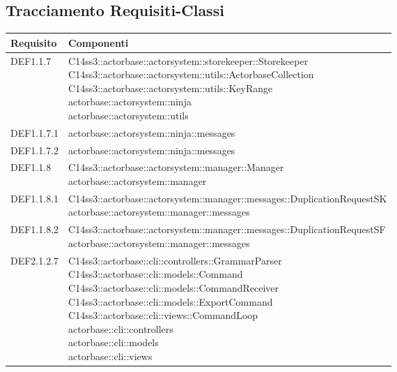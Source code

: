 \documentclass{scalatekids-article}
\begin{document}
\subsection{Tracciamento Requisiti-Classi}
\begin{longtable}[H]{|p{4.5cm}|p{13cm}|}
\hline
\textbf{Requisito} & \textbf{Componenti}\\
\hline
DEF1.1.7 & \multiLineCell[t]{C14ss3::actorbase::actorsystem::storekeeper::Storekeeper\\C14ss3::actorbase::actorsystem::utils::ActorbaseCollection\\C14ss3::actorbase::actorsystem::utils::KeyRange\\actorbase::actorsystem::ninja\\actorbase::actorsystem::utils\\}\\
\hline
DEF1.1.7.1 & \multiLineCell[t]{actorbase::actorsystem::ninja::messages\\}\\
\hline
DEF1.1.7.2 & \multiLineCell[t]{actorbase::actorsystem::ninja::messages\\}\\
\hline
DEF1.1.8 & \multiLineCell[t]{C14ss3::actorbase::actorsystem::manager::Manager\\actorbase::actorsystem::manager\\}\\
\hline
DEF1.1.8.1 & \multiLineCell[t]{C14ss3::actorbase::actorsystem::manager::messages::DuplicationRequestSK\\actorbase::actorsystem::manager::messages\\}\\
\hline
DEF1.1.8.2 & \multiLineCell[t]{C14ss3::actorbase::actorsystem::manager::messages::DuplicationRequestSF\\actorbase::actorsystem::manager::messages\\}\\
\hline
DEF2.1.2.7 & \multiLineCell[t]{C14ss3::actorbase::cli::controllers::GrammarParser\\C14ss3::actorbase::cli::models::Command\\C14ss3::actorbase::cli::models::CommandReceiver\\C14ss3::actorbase::cli::models::ExportCommand\\C14ss3::actorbase::cli::views::CommandLoop\\actorbase::cli::controllers\\actorbase::cli::models\\actorbase::cli::views\\}\\

\end{longtable}
\end{document}
